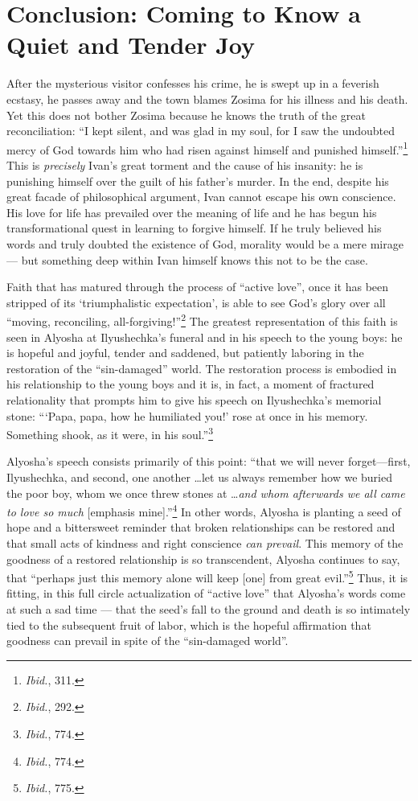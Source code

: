 \section{Conclusion: Coming to Know a Quiet and Tender Joy}
After the mysterious visitor confesses his crime, he is swept up in a feverish ecstasy, he passes away and the town blames Zosima for his illness and his death. Yet this does not bother Zosima because he knows the truth of the great reconciliation: ``I kept silent, and was glad in my soul, for I saw the undoubted mercy of God towards him who had risen against himself and punished himself.''\footnote{\emph{Ibid.}, 311.} This is \emph{precisely} Ivan's great torment and the cause of his insanity: he is punishing himself over the guilt of his father's murder.  In the end, despite his great facade of philosophical argument, Ivan cannot escape his own conscience. His love for life has prevailed over the meaning of life and he has begun his transformational quest in learning to forgive himself. If he truly believed his words and truly doubted the existence of God, morality would be a mere mirage --- but something deep within Ivan himself knows this not to be the case.

Faith that has matured through the process of ``active love'', once it has been stripped of its `triumphalistic expectation', is able to see God's glory over all ``moving, reconciling, all-forgiving!\thinspace''\footnote{\emph{Ibid.}, 292.} The greatest representation of this faith is seen in Alyosha at Ilyushechka's funeral and in his speech to the young boys: he is hopeful and joyful, tender and saddened, but patiently laboring in the restoration of the ``sin-damaged'' world. The restoration process is embodied in his relationship to the young boys and it is, in fact, a moment of fractured relationality that prompts him to give his speech on Ilyushechka's memorial stone: ``\thinspace`Papa, papa, how he humiliated you!\thinspace' rose at once in his memory. Something shook, as it were, in his soul.''\footnote{\emph{Ibid.}, 774.}

Alyosha's speech consists primarily of this point: ``that we will never forget---first, Ilyushechka, and second, one another \ldots let us always remember how we buried the poor boy, whom we once threw stones at \ldots \emph{and whom afterwards we all came to love so much} [emphasis mine].''\footnote{\emph{Ibid.}, 774.} In other words, Alyosha is planting a seed of hope and a bittersweet reminder that broken relationships can be restored and that small acts of kindness and right conscience \emph{can prevail}. This memory of the goodness of a restored relationship is so transcendent, Alyosha continues to say, that ``perhaps just this memory alone will keep [one] from great evil.''\footnote{\emph{Ibid.}, 775.} Thus, it is fitting, in this full circle actualization of ``active love'' that Alyosha's words come at such a sad time --- that the seed's fall to the ground and death is so intimately tied to the subsequent fruit of labor, which is the hopeful affirmation that goodness can prevail in spite of the ``sin-damaged world''.

\pagebreak
